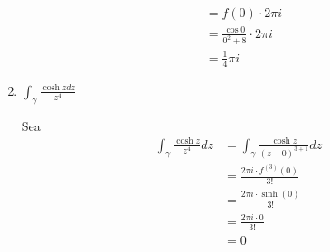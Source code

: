 \begin{problema}
\begin{enumerate}
\begin{sol}
\begin{align*}
                &= f(0)\cdot 2\pi i\\
                &= \frac{\cos 0}{0^2+8}\cdot 2\pi i\\
                &= \frac{1}{4}\pi i
            \end{align*}
        \end{sol}
        \item $\int_\gamma \frac{\cosh z d z}{z^4}$
        \begin{sol}
            Sea
            \begin{align*}
                \int_\gamma \frac{\cosh z}{z^4}dz &= \int_\gamma \frac{\cosh z}{(z-0)^{3+1}}dz\\
                &= \frac{2\pi i \cdot f^{(3)}(0)}{3!}\\
                &=\frac{2\pi i \cdot \sinh(0)}{3!}\\
                &=\frac{2\pi i \cdot 0}{3!}\\
                &= 0
            \end{align*}
        \end{sol}
    \end{enumerate}
\end{problema}



